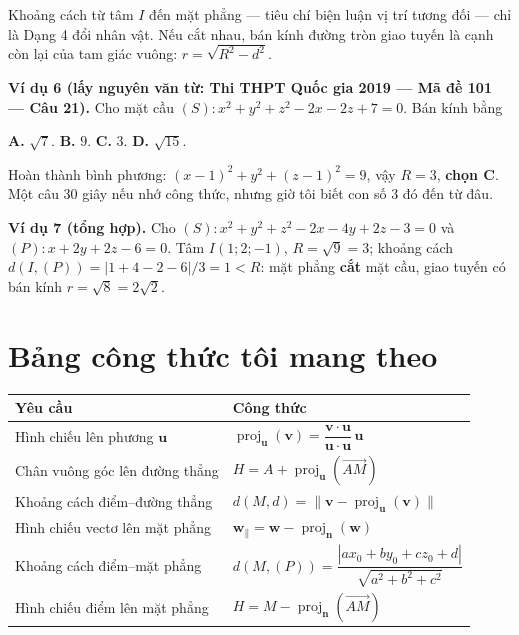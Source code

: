 \documentclass[12pt,a4paper]{article}
\begin{document}
Khoảng cách từ tâm $I$ đến mặt phẳng --- tiêu chí biện luận vị trí tương đối --- chỉ là Dạng 4 đổi nhân vật. Nếu cắt nhau, bán kính đường tròn giao tuyến là cạnh còn lại của tam giác vuông: $r = \sqrt{R^2-d^2}$.

\textbf{Ví dụ 6 (lấy nguyên văn từ: Thi THPT Quốc gia 2019 --- Mã đề 101 --- Câu 21).} Cho mặt cầu $(S): x^2+y^2+z^2-2x-2z+7=0$. Bán kính bằng

\textbf{A.} $\sqrt{7}$. \qquad \textbf{B.} $9$. \qquad \textbf{C.} $3$. \qquad \textbf{D.} $\sqrt{15}$.

Hoàn thành bình phương: $(x-1)^2+y^2+(z-1)^2 = 9$, vậy $R=3$, \textbf{chọn C}. Một câu 30 giây nếu nhớ công thức, nhưng giờ tôi biết con số 3 đó đến từ đâu.

\textbf{Ví dụ 7 (tổng hợp).} Cho $(S): x^2+y^2+z^2-2x-4y+2z-3=0$ và $(P): x+2y+2z-6=0$. Tâm $I(1;2;-1)$, $R=\sqrt{9}=3$; khoảng cách $d(I,(P)) = |1+4-2-6|/3 = 1 < R$: mặt phẳng \textbf{cắt} mặt cầu, giao tuyến có bán kính $r=\sqrt{8}=2\sqrt{2}$.

\section{Bảng công thức tôi mang theo}

\begin{center}
\begin{tabular}{|l|l|}
\hline
\textbf{Yêu cầu} & \textbf{Công thức} \\
\hline
Hình chiếu lên phương $\mathbf{u}$ & $\operatorname{proj}_{\mathbf{u}}(\mathbf{v}) = \dfrac{\mathbf{v}\cdot\mathbf{u}}{\mathbf{u}\cdot\mathbf{u}}\,\mathbf{u}$ \\
\hline
Chân vuông góc lên đường thẳng & $H = A + \operatorname{proj}_{\mathbf{u}}(\overrightarrow{AM})$ \\
\hline
Khoảng cách điểm--đường thẳng & $d(M,d) = \bigl\|\mathbf{v} - \operatorname{proj}_{\mathbf{u}}(\mathbf{v})\bigr\|$ \\
\hline
Hình chiếu vectơ lên mặt phẳng & $\mathbf{w}_{\parallel} = \mathbf{w} - \operatorname{proj}_{\mathbf{n}}(\mathbf{w})$ \\
\hline
Khoảng cách điểm--mặt phẳng & $d(M,(P)) = \dfrac{|ax_0+by_0+cz_0+d|}{\sqrt{a^2+b^2+c^2}}$ \\
\hline
Hình chiếu điểm lên mặt phẳng & $H = M - \operatorname{proj}_{\mathbf{n}}(\overrightarrow{AM})$ \\
\hline
\end{tabular}
\end{center}
\end{document}
